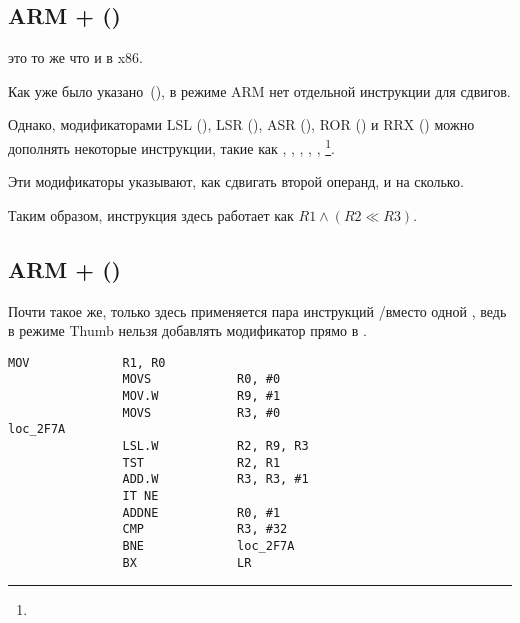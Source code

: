 \subsection{ARM + \OptimizingXcodeIV (\ARMMode)}



\TST это то же что и \TEST в x86.

Как уже было указано~(),
в режиме ARM нет отдельной инструкции для сдвигов.

Однако, модификаторами 
LSL (), 
LSR (), 
ASR (), 
ROR () и
RRX () можно дополнять некоторые инструкции, такие как \MOV, \TST,
\CMP, \ADD, \SUB, \RSB\footnote{\DataProcessingInstructionsFootNote}.

Эти модификаторы указывают, как сдвигать второй операнд, и на сколько.

Таким образом, инструкция   здесь работает как $R1 \land (R2 \ll R3)$.

\subsection{ARM + \OptimizingXcodeIV (\ThumbTwoMode)}

Почти такое же, только здесь применяется пара инструкций /\TST вместо одной \TST,
ведь в режиме Thumb нельзя добавлять модификатор \LSL прямо в \TST.

\begin{lstlisting}[label=ARM_leaf_example5]
                MOV             R1, R0
                MOVS            R0, #0
                MOV.W           R9, #1
                MOVS            R3, #0
loc_2F7A
                LSL.W           R2, R9, R3
                TST             R2, R1
                ADD.W           R3, R3, #1
                IT NE
                ADDNE           R0, #1
                CMP             R3, #32
                BNE             loc_2F7A
                BX              LR
\end{lstlisting}

